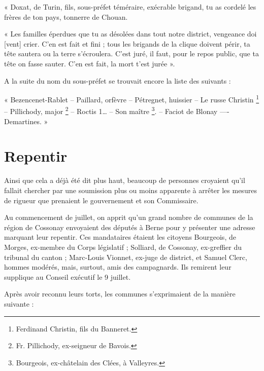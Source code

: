 \documentclass[french,twoside]{book} %
\newenvironment{quoteblock}%
  {\begin{quoting}}
  {\end{quoting}}
\newenvironment{quotebar}{%
    \def\FrameCommand{{\color{rubric!10!}\vrule width 0.5em} \hspace{0.9em}}%
    \def\OuterFrameSep{\itemsep} %
    \MakeFramed {\advance\hsize-\width \FrameRestore}
  }%
  {%
    \endMakeFramed
  }
\renewenvironment{quoteblock}%
  {%
    \savenotes
    \setstretch{0.9}
    \begin{quotebar}
  }
  {%
    \end{quotebar}
    \spewnotes
  }
\begin{document}
\begin{quoteblock}
 \noindent « Doxat, de Turin, fils, sous-préfet téméraire, exécrable brigand, tu as cordelé les frères de ton pays, tonnerre de Chouan.\par
 « Les familles éperdues que tu as désolées dans tout notre district, vengeance doi [vent] crier. C’en est fait et fini ; tous les brigands de la clique doivent périr, ta tête sautera ou la terre s’écroulera. C’est juré, il faut, pour le repos public, que ta tête on fasse sauter. C’en est fait, la mort t’est jurée ».\par
 A la suite du nom du sous-préfet se trouvait encore la liste des suivants :\par
 « Bezencenet-Rablet – Paillard, orfèvre – Pétregnet, huissier – Le russe Christin \footnote{Ferdinand Christin, fils du Banneret.} – Pillichody, major \footnote{Fr. Pillichody, ex-seigneur de Bavois.} – Roctis 1… – Son maître \footnote{Bourgeois, ex-châtelain des Clées, à Valleyres.}. – Faciot de Blonay —- Demartines. »
 \end{quoteblock}

\section[Repentir]{Repentir}
\noindent Ainsi que cela a déjà été dit plus haut, beaucoup de personnes croyaient qu’il fallait chercher par une soumission plus ou moins apparente à arrêter les mesures de rigueur que prenaient le gouvernement et son Commissaire.\par
Au commencement de juillet, on apprit qu’un grand nombre de communes de la région de Cossonay envoyaient des députés à Berne pour y présenter une adresse marquant leur repentir. Ces mandataires étaient les citoyens Bourgeois, de Morges, ex-membre du Corps législatif ; Solliard, de Cossonay, ex-greffier du tribunal du canton ; Marc-Louis Vionnet, ex-juge de district, et Samuel Clerc, hommes modérés, mais, surtout, amis des campagnards. Ils remirent leur supplique au Conseil exécutif le 9 juillet.\par
Après avoir reconnu leurs torts, les communes s’exprimaient de la manière suivante :\par
\end{document}
